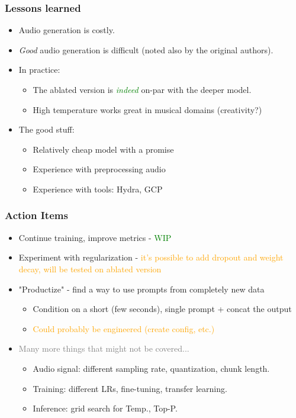 \documentclass{beamer}
\begin{document}
\begin{frame}
    \frametitle{Lessons learned}
    \begin{itemize}
        \item Audio generation is costly.
        \item \textit{Good} audio generation is difficult (noted also by the original authors).
        \item In practice:
        \begin{itemize}
            \item The ablated version is \textcolor{green}{\textit{indeed}} on-par with the deeper model.
            \item High temperature works great in musical domains (creativity?)
        \end{itemize}
        \item The good stuff:
        \begin{itemize}
            \item Relatively cheap model with a promise
            \item Experience with preprocessing audio
            \item Experience with tools: Hydra, GCP
        \end{itemize} 
    \end{itemize}
\end{frame}

\begin{frame}
    \frametitle{Action Items}
    \begin{itemize}
        \item Continue training, improve metrics - \textcolor{green}{WIP}
        \item Experiment with regularization - \textcolor{orange}{it's possible to add dropout and weight decay, will be tested on ablated version}
        \item "Productize" - find a way to use prompts from completely new data
        \begin{itemize}
        \item Condition on a short (few seconds), single prompt + concat the output
        \item \textcolor{orange}{Could probably be engineered (create config, etc.)}
        \end{itemize}
        \item \textcolor{gray}{Many more things that might not be covered...}
        \begin{itemize}
            \item Audio signal: different sampling rate, quantization, chunk length.
            \item Training: different LRs, fine-tuning, transfer learning.
            \item Inference: grid search for Temp., Top-P.
        \end{itemize}
    \end{itemize}
\end{frame}
\end{document}
